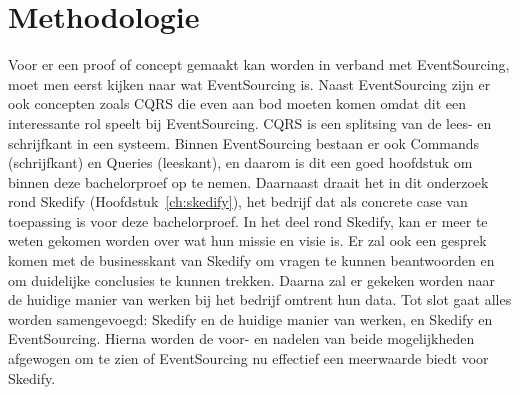 
\chapter{Methodologie}
\label{ch:methodologie}



Voor er een proof of concept gemaakt kan worden in verband met EventSourcing, moet men eerst kijken naar wat EventSourcing is. Naast EventSourcing zijn er ook concepten zoals \gls{CQRS} die even aan bod moeten komen omdat dit een interessante rol speelt bij EventSourcing. \gls{CQRS} is een splitsing van de lees- en schrijfkant in een systeem. Binnen EventSourcing bestaan er ook Commands (schrijfkant) en Queries (leeskant), en daarom is dit een goed hoofdstuk om binnen deze bachelorproef op te nemen. Daarnaast draait het in dit onderzoek rond Skedify (Hoofdstuk~\ref{ch:skedify}), het bedrijf dat als concrete case van toepassing is voor deze bachelorproef. In het deel rond Skedify, kan er meer te weten gekomen worden over wat hun missie en visie is. Er zal ook een gesprek komen met de businesskant van Skedify om vragen te kunnen beantwoorden en om duidelijke conclusies te kunnen trekken. Daarna zal er gekeken worden naar de huidige manier van werken bij het bedrijf omtrent hun data. Tot slot gaat alles worden samengevoegd: Skedify en de huidige manier van werken, en Skedify en EventSourcing. Hierna worden de voor- en nadelen van beide mogelijkheden afgewogen om te zien of EventSourcing nu effectief een meerwaarde biedt voor Skedify.
